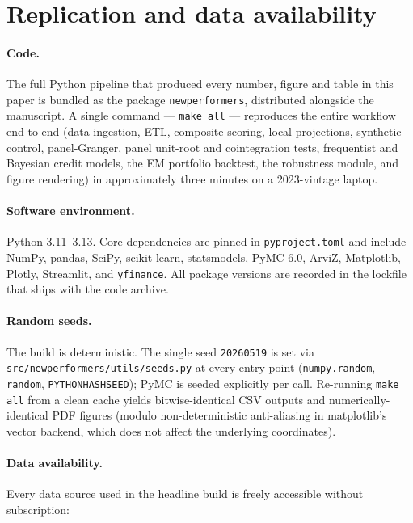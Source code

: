 \section*{Replication and data availability}\label{sec:replication}

\paragraph{Code.} The full Python pipeline that produced every number, figure and table in this paper is bundled as the package \texttt{newperformers}, distributed alongside the manuscript. A single command --- \verb|make all| --- reproduces the entire workflow end-to-end (data ingestion, ETL, composite scoring, local projections, synthetic control, panel-Granger, panel unit-root and cointegration tests, frequentist and Bayesian credit models, the EM portfolio backtest, the robustness module, and figure rendering) in approximately three minutes on a 2023-vintage laptop.

\paragraph{Software environment.} Python 3.11--3.13. Core dependencies are pinned in \texttt{pyproject.toml} and include NumPy, pandas, SciPy, scikit-learn, statsmodels, PyMC 6.0, ArviZ, Matplotlib, Plotly, Streamlit, and \texttt{yfinance}. All package versions are recorded in the lockfile that ships with the code archive.

\paragraph{Random seeds.} The build is deterministic. The single seed \texttt{20260519} is set via \texttt{src/newperformers/utils/seeds.py} at every entry point (\texttt{numpy.random}, \texttt{random}, \texttt{PYTHONHASHSEED}); PyMC is seeded explicitly per call. Re-running \verb|make all| from a clean cache yields bitwise-identical CSV outputs and numerically-identical PDF figures (modulo non-deterministic anti-aliasing in matplotlib's vector backend, which does not affect the underlying coordinates).

\paragraph{Data availability.} Every data source used in the headline build is freely accessible without subscription:

